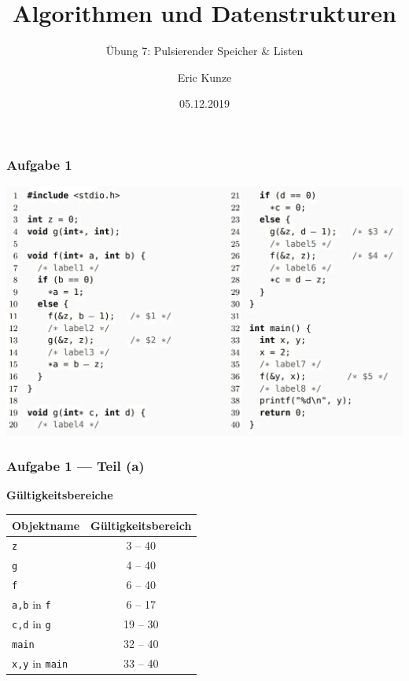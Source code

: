 \documentclass{beamer}
\begin{document}
	
	\title{Algorithmen und Datenstrukturen}
	\subtitle{Übung 7: Pulsierender Speicher \& Listen}
	\author{Eric Kunze}
	\date{05.12.2019}

	\maketitle


\begin{frame} \frametitle{Aufgabe 1}
	\centering
	\includegraphics[width=\textwidth]{./tut07_aufgabe1.jpg}
\end{frame}

\begin{frame} \frametitle{Aufgabe 1 --- Teil (a)}
	\textbf{Gültigkeitsbereiche}
	
	\centering
	\begin{tabular}{|l|c|}
		\hline
		Objektname & Gültigkeitsbereich \\ \hline \hline
		\texttt{z} & 3 -- 40 \\ \hline
		\texttt{g} & 4 -- 40 \\ \hline
		\texttt{f} & 6 -- 40 \\ \hline
		\texttt{a,b} in \texttt{f} & 6 -- 17 \\ \hline
		\texttt{c,d} in \texttt{g} & 19 -- 30 \\ \hline
		\texttt{main} & 32 -- 40 \\ \hline
		\texttt{x,y} in \texttt{main} & 33 -- 40 \\ \hline
	\end{tabular}
\end{frame}
\end{document}
